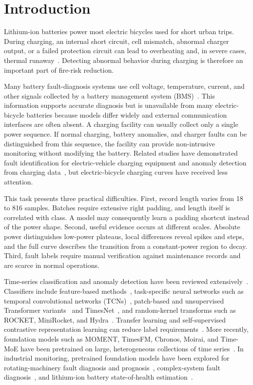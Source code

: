 \documentclass{iopjournal}
\begin{document}
\section{Introduction}\label{sec:intro}

Lithium-ion batteries power most electric bicycles used for short urban trips. During charging, an internal short circuit, cell mismatch, abnormal charger output, or a failed protection circuit can lead to overheating and, in severe cases, thermal runaway~\cite{feng2018}. Detecting abnormal behavior during charging is therefore an important part of fire-risk reduction.

Many battery fault-diagnosis systems use cell voltage, temperature, current, and other signals collected by a battery management system (BMS)~\cite{zhang2023,hu2020}. This information supports accurate diagnosis but is unavailable from many electric-bicycle batteries because models differ widely and external communication interfaces are often absent. A charging facility can usually collect only a single power sequence. If normal charging, battery anomalies, and charger faults can be distinguished from this sequence, the facility can provide non-intrusive monitoring without modifying the battery. Related studies have demonstrated fault identification for electric-vehicle charging equipment and anomaly detection from charging data~\cite{park2022,duan2024,xu2025,sun2025}, but electric-bicycle charging curves have received less attention.

This task presents three practical difficulties. First, record length varies from 18 to 816 samples. Batches require extensive right padding, and length itself is correlated with class. A model may consequently learn a padding shortcut instead of the power shape. Second, useful evidence occurs at different scales. Absolute power distinguishes low-power plateaus, local differences reveal spikes and steps, and the full curve describes the transition from a constant-power region to decay. Third, fault labels require manual verification against maintenance records and are scarce in normal operations.

Time-series classification and anomaly detection have been reviewed extensively~\cite{schmidl2022,fawaz2019,middlehurst2024}. Classifiers include feature-based methods~\cite{breiman2001,friedman2001,cortes1995}, task-specific neural networks such as temporal convolutional networks (TCNs)~\cite{bai2018}, patch-based and unsupervised Transformer variants~\cite{zerveas2021,nie2023} and TimesNet~\cite{wu2023}, and random-kernel transforms such as ROCKET, MiniRocket, and Hydra~\cite{dempster2020,dempster2021,dempster2023}. Transfer learning and self-supervised contrastive representation learning can reduce label requirements~\cite{eldele2021,yue2022}. More recently, foundation models such as MOMENT, TimesFM, Chronos, Moirai, and Time-MoE have been pretrained on large, heterogeneous collections of time series~\cite{goswami2024,das2024,ansari2024,woo2024,shi2025}. In industrial monitoring, pretrained foundation models have been explored for rotating-machinery fault diagnosis and prognosis~\cite{wang2025}, complex-system fault diagnosis~\cite{zheng2024}, and lithium-ion battery state-of-health estimation~\cite{sun2025b}.
\end{document}
